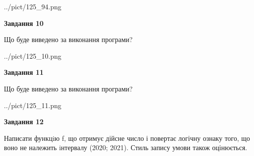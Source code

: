 \documentclass[12pt, ukrainian]{article}
\begin{document}
{\begin {large}
\begin{center}
	{../pict/125_94.png}
\end{center}
\newpage

{\begin {center}\textbf{Завдання 10}\end {center}}

Що буде виведено за виконання програми?\par
\begin{center}
	{../pict/125_10.png}
\end{center}
\newpage

{\begin {center}\textbf{Завдання 11}\end {center}}

Що буде виведено за виконання програми?\par
\begin{center}
	{../pict/125_11.png}
\end{center}
\newpage

{\begin {center}\textbf{Завдання 12}\end {center}}


Написати функцiю f, що отримує дійсне число і повертає логічну ознаку того, що воно не належить iнтервалу (2020; 2021). Стиль запису умови також оцінюється.\par
\newpage

\end {large}}
\end{document}
